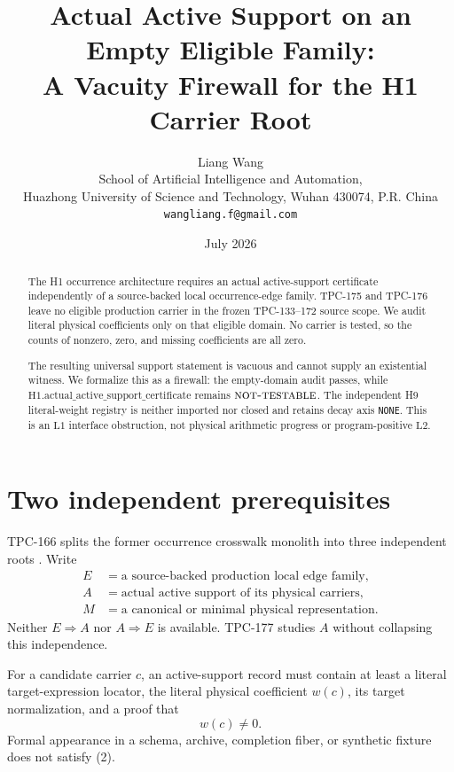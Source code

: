 \documentclass[11pt]{article}
\title{\textbf{Actual Active Support on an Empty Eligible Family:}\\
\textbf{A Vacuity Firewall for the H1 Carrier Root}}
\author{Liang Wang\\
School of Artificial Intelligence and Automation,\\
Huazhong University of Science and Technology, Wuhan 430074, P.R. China\\
\texttt{wangliang.f@gmail.com}}
\date{July 2026}
\theoremstyle{definition}
\theoremstyle{remark}
\newcommand{\Lone}{\mathrm{L1}}
\newcommand{\Ltwo}{\mathrm{L2}}
\newcommand{\NT}{\textnormal{\textsc{not-testable}}}
\begin{document}
\maketitle

\begin{abstract}
The H1 occurrence architecture requires an actual active-support
certificate independently of a source-backed local occurrence-edge
family.  TPC-175 and TPC-176 leave no eligible production carrier in
the frozen TPC-133--172 source scope.  We audit literal physical
coefficients only on that eligible domain.  No carrier is tested, so
the counts of nonzero, zero, and missing coefficients are all zero.

The resulting universal support statement is vacuous and cannot
supply an existential witness.  We formalize this as a firewall:
the empty-domain audit passes, while
\(\mathrm{H1.actual\_active\_support\_certificate}\) remains
\(\NT\).  The independent H9 literal-weight registry is neither
imported nor closed and retains decay axis \texttt{NONE}.  This is an
\(\Lone\) interface obstruction, not physical arithmetic progress or
program-positive \(\Ltwo\).
\end{abstract}

\section{Two independent prerequisites}

TPC-166 splits the former occurrence crosswalk monolith into three
independent roots \cite{WangTPC166}.  Write
\[
\begin{aligned}
 E&=\text{a source-backed production local edge family},\\
 A&=\text{actual active support of its physical carriers},\\
 M&=\text{a canonical or minimal physical representation}.
\end{aligned}                                                     \tag{1}
\]
Neither \(E\Rightarrow A\) nor \(A\Rightarrow E\) is available.
TPC-177 studies \(A\) without collapsing this independence.

For a candidate carrier \(c\), an active-support record must contain
at least a literal target-expression locator, the literal physical
coefficient \(w(c)\), its target normalization, and a proof that
\[
 w(c)\ne0.                                                        \tag{2}
\]
Formal appearance in a schema, archive, completion fiber, or
synthetic fixture does not satisfy (2).
\end{document}
